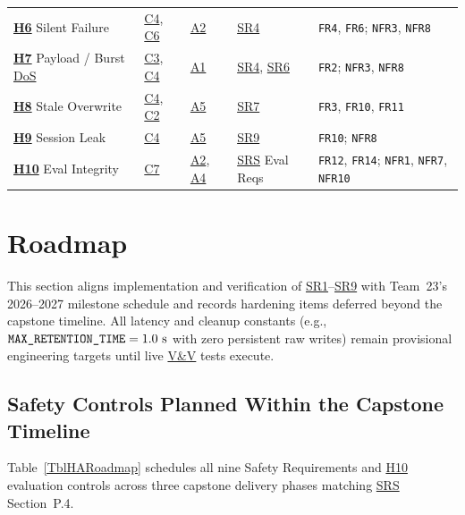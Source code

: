 \documentclass[11pt]{article}
\newcommand{\MaxRetentionTime}{\texttt{MAX\_\allowbreak{}RETENTION\_\allowbreak{}TIME}}
\newcommand{\DoS}{\hyperlink{ha-acr-dos}{DoS}}
\newcommand{\SRS}{\hyperlink{ha-acr-srs}{SRS}}
\newcommand{\VnV}{\hyperlink{ha-acr-vnv}{V\&V}}
\begin{document}
{\begin{tabularx}{\textwidth}{P{2.6cm} P{1.7cm} P{1.5cm} P{2.2cm} Y}
\hyperref[haz:H6]{\textbf{H6}} Silent Failure & \hyperref[comp:C4]{C4}, \hyperref[comp:C6]{C6} & \hyperref[assump:A2]{A2} & \hyperref[SR4]{SR4} & \texttt{FR4}, \texttt{FR6}; \texttt{NFR3}, \texttt{NFR8}\\
\hyperref[haz:H7]{\textbf{H7}} Payload / Burst \DoS{} & \hyperref[comp:C3]{C3}, \hyperref[comp:C4]{C4} & \hyperref[assump:A1]{A1} & \hyperref[SR4]{SR4}, \hyperref[SR6]{SR6} & \texttt{FR2}; \texttt{NFR3}, \texttt{NFR8}\\
\hyperref[haz:H8]{\textbf{H8}} Stale Overwrite & \hyperref[comp:C4]{C4}, \hyperref[comp:C2]{C2} & \hyperref[assump:A5]{A5} & \hyperref[SR7]{SR7} & \texttt{FR3}, \texttt{FR10}, \texttt{FR11}\\
\hyperref[haz:H9]{\textbf{H9}} Session Leak & \hyperref[comp:C4]{C4} & \hyperref[assump:A5]{A5} & \hyperref[SR9]{SR9} & \texttt{FR10}; \texttt{NFR8}\\
\hyperref[haz:H10]{\textbf{H10}} Eval Integrity & \hyperref[comp:C7]{C7} & \hyperref[assump:A2]{A2}, \hyperref[assump:A4]{A4} & \SRS{} Eval Reqs & \texttt{FR12}, \texttt{FR14}; \texttt{NFR1}, \texttt{NFR7}, \texttt{NFR10}\\
\end{tabularx}
}

\section{Roadmap}\label{sec:roadmap}

This section aligns implementation and verification of \hyperref[SR1]{SR1}--\hyperref[SR9]{SR9} with Team~23's 2026--2027 milestone schedule and records hardening items deferred beyond the capstone timeline. All latency and cleanup constants (e.g., $\MaxRetentionTime{}=1.0\text{ s}$ with zero persistent raw writes) remain provisional engineering targets until live \VnV{} tests execute.

\subsection{Safety Controls Planned Within the Capstone Timeline}

Table~\ref{TblHARoadmap} schedules all nine Safety Requirements and \hyperref[haz:H10]{H10} evaluation controls across three capstone delivery phases matching \SRS{} Section~P.4.
\end{document}
